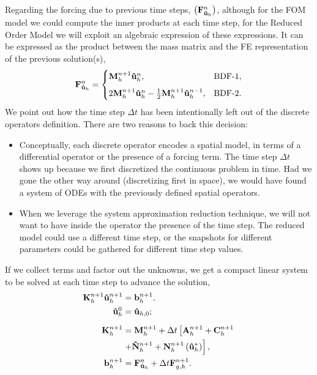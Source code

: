 \documentclass[../../thesis.tex]{subfiles}
\newcommand{\dt}{\ensuremath{\Delta t}}
\newcommand{\Ah}[1]{\ensuremath{\vb{#1}^{n+1}_h}}
\begin{document}
Regarding the forcing due to previous time steps, $\left(\vb{F}_{\vb{\hat{u}}_h}^{n}\right)$, 
although for the FOM model we could compute the inner products at each time step, 
for the Reduced Order Model we will exploit an algebraic expression of these expressions.
It can be expressed as the product between the mass matrix and the FE representation of the previous solution(s), 
\begin{equation}
    \label{eq:1d_fom_forcing_term_time_mass_matrix}
    \vb{F}_{\vb{\hat{u}}_h}^{n}= 
    \begin{cases}
        \vb{M}_{h}^{n+1} \vb{\hat{u}}_{h}^{n},                &\text{BDF-1},
        \\[2mm]
        2\vb{M}_{h}^{n+1} \vb{\hat{u}}_{h}^{n}
        - \frac{1}{2}\vb{M}_{h}^{n+1} \vb{\hat{u}}_{h}^{n-1}, &\text{BDF-2}.
    \end{cases}
\end{equation}
We point out how the time step $\dt$ has been intentionally left out of the discrete operators definition.
There are two reasons to back this decision:
\begin{itemize}
    \item Conceptually, each discrete operator encodes a spatial model, 
    in terms of a differential operator or the presence of a forcing term.
    The time step $\dt$ shows up because we first discretized the continuous problem in time. 
    Had we gone the other way around (discretizing first in space), 
    we would have found a system of ODEs with the previously defined spatial operators. 
    \item When we leverage the system approximation reduction technique, 
    we will not want to have inside the operator the presence of the time step.
    The reduced model could use a different time step, 
    or the snapshots for different parameters could be gathered for different time step values.
\end{itemize}

If we collect terms and factor out the unknowns, we get a compact linear system to be solved at each time step to advance the solution,
\begin{subequations}
    \begin{align}
        \label{eq:1d_fom_linear_system_timestep}
        \vb{K}_h^{n+1} \vb{\hat{u}}_h^{n+1} &= \vb{b}_h^{n+1}, 
        \\
        \vb{\hat{u}}_h^{0} &= \vb{\hat{u}}_{h,0};
        \\[2mm]
        \vb{K}_h^{n+1} &= \Ah{M} + \dt \left[\Ah{A} + \Ah{C} \right. 
        \nonumber 
        \\
                        &\left. + \Ah{\hat{N}} + \Ah{N}\left(\vb{\hat{u}}_{h}^{*}\right)\right],
        \\
        \vb{b}_h^{n+1} &= \vb{F}_{\vb{\hat{u}}_h}^{n} + \dt \vb{F}_{g,h}^{n+1}.
    \end{align}
\end{subequations}
\end{document}
